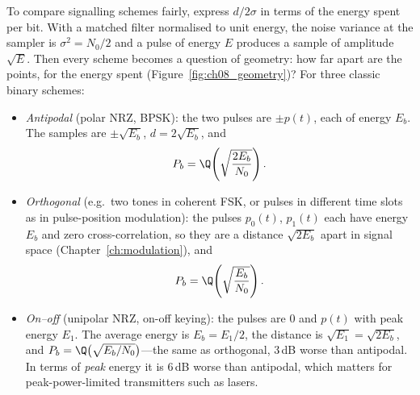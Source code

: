 To compare signalling schemes fairly, express $d/2\sigma$ in terms of the energy spent per bit.
With a matched filter normalised to unit energy, the noise variance at the sampler is
$\sigma^2=N_0/2$ and a pulse of energy $E$ produces a sample of amplitude $\sqrt E$. Then every
scheme becomes a question of geometry: how far apart are the points, for the energy spent
(Figure~\ref{fig:ch08_geometry})? For three classic binary schemes:
\begin{itemize}
\item \emph{Antipodal} (polar NRZ, BPSK): the two pulses are $\pm p(t)$, each of energy $E_b$.
The samples are $\pm\sqrt{E_b}$, $d=2\sqrt{E_b}$, and
\begin{equation}
P_b=\Q\!\left(\sqrt{\frac{2E_b}{N_0}}\right).
\label{eq:ch08:antipodal}
\end{equation}
\item \emph{Orthogonal} (e.g.\ two tones in coherent FSK, or pulses in different time slots as
in pulse-position modulation): the pulses $p_0(t)$, $p_1(t)$ each have energy $E_b$ and zero
cross-correlation, so they are a distance $\sqrt{2E_b}$ apart in signal space
(Chapter~\ref{ch:modulation}), and
\begin{equation}
P_b=\Q\!\left(\sqrt{\frac{E_b}{N_0}}\right).
\end{equation}
\item \emph{On--off} (unipolar NRZ, on-off keying): the pulses are $0$ and $p(t)$ with peak
energy $E_1$. The average energy is $E_b=E_1/2$, the distance is $\sqrt{E_1}=\sqrt{2E_b}$, and
$P_b=\Q\big(\sqrt{E_b/N_0}\big)$---the same as orthogonal, 3\,dB worse than antipodal. In terms
of \emph{peak} energy it is 6\,dB worse than antipodal, which matters for peak-power-limited
transmitters such as lasers.
\end{itemize}



